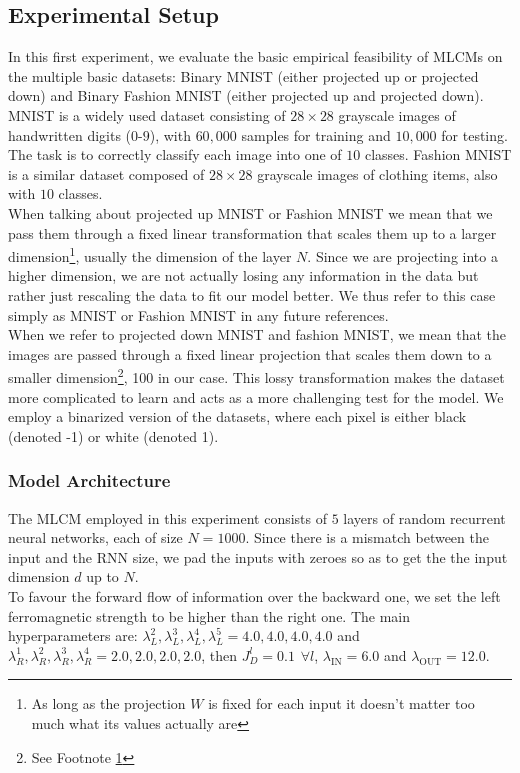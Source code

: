 \documentclass[a4paper,12pt]{report}
\begin{document}
\subsection{Experimental Setup}
In this first experiment, we evaluate the basic empirical feasibility of MLCMs on 
the multiple basic datasets: Binary MNIST (either projected up or projected down) and 
Binary Fashion MNIST (either projected up and projected down). 
MNIST is a widely used dataset consisting of $28 \times 28$ grayscale images of 
handwritten digits ($0$-$9$), with $60,\!000$ samples for training and $10,\!000$ 
for testing. The task is to correctly classify each image into 
one of $10$ classes. Fashion MNIST is a similar dataset composed of $28 \times 28$ 
grayscale images of clothing items, also with $10$ classes. \\
When talking about projected up MNIST or Fashion MNIST we mean that we pass them 
through a fixed linear transformation that scales them up to a larger 
dimension\footnote{\label{footnote:projection}As long as the projection 
$W$ is fixed for each input it doesn't matter too much what its values actually are}, 
usually the dimension of the layer $N$. Since we are projecting into a higher dimension, 
we are not actually losing any information in the data but rather just rescaling the data
to fit our model better. We thus refer to this case simply as MNIST or Fashion MNIST in any 
future references. \\
When we refer to projected down MNIST and fashion MNIST, we mean 
that the images are passed through a fixed linear projection that scales them down to a smaller 
dimension\footnote{See Footnote \ref{footnote:projection}}, 100 in our 
case. This lossy transformation makes the dataset more complicated to learn and 
acts as a more challenging test for the model. 
We employ a binarized version of the datasets, where each pixel is either black 
(denoted -1) or white (denoted 1).
%
\subsubsection*{Model Architecture}
The MLCM employed in this experiment consists of $5$ layers of random recurrent 
neural networks, each of size $N=1000$. Since there is a mismatch between the 
input and the RNN size, we pad the inputs with zeroes so as to get the 
the input dimension $d$ up to $N$. \\
To favour the forward flow of information over the backward one, we set the left 
ferromagnetic strength to be higher than the right one. The main 
hyperparameters are: $\lambda^2_L, \lambda^3_L, \lambda^4_L, 
\lambda^5_L = 4.0, 4.0, 4.0, 4.0$ and $\lambda^1_R, \lambda^2_R, \lambda^3_R, 
\lambda^4_R = 2.0, 2.0, 2.0, 2.0$, then $J_D^l = 0.1 \hspace{5pt} 
\forall l$, $\lambda_{\mathrm{IN}} = 6.0$ and $\lambda_{\mathrm{OUT}} = 12.0$.
%
\end{document}
